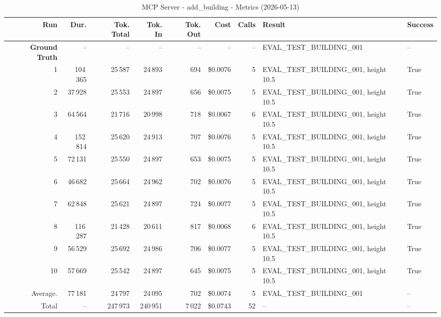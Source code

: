 \documentclass[a4paper,11pt]{article}
\begin{document}
\begin{table}[ht]
\centering
\scriptsize
\caption{MCP Server - add\_building - Metrics (2026-05-13)}
\label{tab:mcp\_add\_building\_metrics\_2026-05-13}
\begin{tabular}{r r r r r r r p{3cm} l}
\hline
Run & Dur. & Tok. Total & Tok. In & Tok. Out & Cost & Calls & Result & Success \\
\hline
\textbf{Ground Truth} & -- & -- & -- & -- & -- & -- & EVAL\_TEST\_BUILDING\_001 & -- \\
\hline
1 & 104\,365 & 25\,587 & 24\,893 & 694 & \$0.0076 & 5 & EVAL\_TEST\_BUILDING\_001, height 10.5 & True \\
2 & 37\,928 & 25\,553 & 24\,897 & 656 & \$0.0075 & 5 & EVAL\_TEST\_BUILDING\_001, height 10.5 & True \\
3 & 64\,564 & 21\,716 & 20\,998 & 718 & \$0.0067 & 6 & EVAL\_TEST\_BUILDING\_001, height 10.5 & True \\
4 & 152\,814 & 25\,620 & 24\,913 & 707 & \$0.0076 & 5 & EVAL\_TEST\_BUILDING\_001, height 10.5 & True \\
5 & 72\,131 & 25\,550 & 24\,897 & 653 & \$0.0075 & 5 & EVAL\_TEST\_BUILDING\_001, height 10.5 & True \\
6 & 46\,682 & 25\,664 & 24\,962 & 702 & \$0.0076 & 5 & EVAL\_TEST\_BUILDING\_001, height 10.5 & True \\
7 & 62\,848 & 25\,621 & 24\,897 & 724 & \$0.0077 & 5 & EVAL\_TEST\_BUILDING\_001, height 10.5 & True \\
8 & 116\,287 & 21\,428 & 20\,611 & 817 & \$0.0068 & 6 & EVAL\_TEST\_BUILDING\_001, height 10.5 & True \\
9 & 56\,529 & 25\,692 & 24\,986 & 706 & \$0.0077 & 5 & EVAL\_TEST\_BUILDING\_001, height 10.5 & True \\
10 & 57\,669 & 25\,542 & 24\,897 & 645 & \$0.0075 & 5 & EVAL\_TEST\_BUILDING\_001, height 10.5 & True \\
\hline
Average. & 77\,181 & 24\,797 & 24\,095 & 702 & \$0.0074 & 5 & EVAL\_TEST\_BUILDING\_001 & -- \\
Total & -- & 247\,973 & 240\,951 & 7\,022 & \$0.0743 & 52 & -- & -- \\
\hline
\end{tabular}
\end{table}

\clearpage
\end{document}
